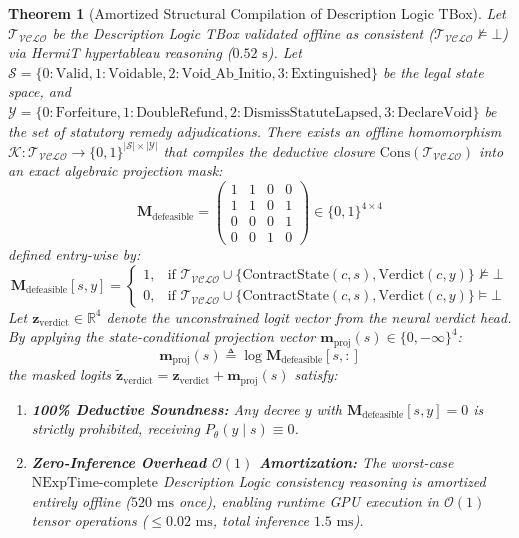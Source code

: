 \documentclass[11pt,a4paper]{article}
\newtheorem{theorem}{Theorem}
\begin{document}
\begin{theorem}[Amortized Structural Compilation of Description Logic TBox]
\label{thm:amortized_compilation}
Let $\mathcal{T}_{\mathcal{VCLO}}$ be the Description Logic TBox validated offline as consistent ($\mathcal{T}_{\mathcal{VCLO}} \not\models \bot$) via HermiT hypertableau reasoning ($0.52\text{ s}$).
Let $\mathcal{S} = \{0: \text{Valid}, 1: \text{Voidable}, 2: \text{Void\_Ab\_Initio}, 3: \text{Extinguished}\}$ be the legal state space, and $\mathcal{Y} = \{0: \text{Forfeiture}, 1: \text{DoubleRefund}, 2: \text{DismissStatuteLapsed}, 3: \text{DeclareVoid}\}$ be the set of statutory remedy adjudications.
There exists an offline homomorphism $\mathcal{K}: \mathcal{T}_{\mathcal{VCLO}} \to \{0, 1\}^{|\mathcal{S}| \times |\mathcal{Y}|}$ that compiles the deductive closure $\mathrm{Cons}(\mathcal{T}_{\mathcal{VCLO}})$ into an exact algebraic projection mask:
\begin{equation}
\label{eq:m_defeasible}
\mathbf{M}_{\text{defeasible}} = \begin{pmatrix}
1 & 1 & 0 & 0 \\
1 & 1 & 0 & 1 \\
0 & 0 & 0 & 1 \\
0 & 0 & 1 & 0
\end{pmatrix} \in \{0, 1\}^{4 \times 4}
\end{equation}
defined entry-wise by:
\begin{equation}
\mathbf{M}_{\text{defeasible}}[s, y] = \begin{cases}
1, & \text{if } \mathcal{T}_{\mathcal{VCLO}} \cup \{ \mathrm{ContractState}(c, s), \mathrm{Verdict}(c, y) \} \not\models \bot \\
0, & \text{if } \mathcal{T}_{\mathcal{VCLO}} \cup \{ \mathrm{ContractState}(c, s), \mathrm{Verdict}(c, y) \} \models \bot
\end{cases}
\end{equation}
Let $\mathbf{z}_{\text{verdict}} \in \mathbb{R}^4$ denote the unconstrained logit vector from the neural verdict head. By applying the state-conditional projection vector $\mathbf{m}_{\text{proj}}(s) \in \{0, -\infty\}^4$:
\begin{equation}
\label{eq:m_proj}
\mathbf{m}_{\text{proj}}(s) \triangleq \log \mathbf{M}_{\text{defeasible}}[s, :]
\end{equation}
the masked logits $\tilde{\mathbf{z}}_{\text{verdict}} = \mathbf{z}_{\text{verdict}} + \mathbf{m}_{\text{proj}}(s)$ satisfy:
\begin{enumerate}[label=(\roman*)]
\item \textbf{100\% Deductive Soundness:} Any decree $y$ with $\mathbf{M}_{\text{defeasible}}[s, y] = 0$ is strictly prohibited, receiving $P_\theta(y \mid s) \equiv 0$.
\item \textbf{Zero-Inference Overhead $\mathcal{O}(1)$ Amortization:} The worst-case $\text{NExpTime-complete}$ Description Logic consistency reasoning is amortized entirely offline ($520\text{ ms}$ once), enabling runtime GPU execution in $\mathcal{O}(1)$ tensor operations ($\le 0.02\text{ ms}$, total inference $1.5\text{ ms}$).
\end{enumerate}
\end{theorem}
\end{document}
